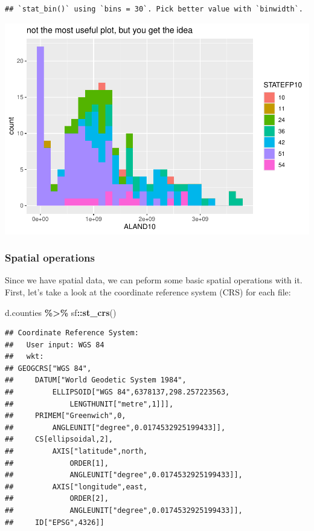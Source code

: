 \documentclass[]{article}
\newenvironment{Shaded}{\begin{snugshade}}{\end{snugshade}}
\newcommand{\FunctionTok}[1]{\textcolor[rgb]{0.13,0.29,0.53}{\textbf{#1}}}
\newcommand{\NormalTok}[1]{#1}
\newcommand{\SpecialCharTok}[1]{\textcolor[rgb]{0.81,0.36,0.00}{\textbf{#1}}}
\begin{document}
\begin{verbatim}
## `stat_bin()` using `bins = 30`. Pick better value with `binwidth`.
\end{verbatim}

\includegraphics{lab01_files/figure-latex/plots2-1.pdf}

\subsubsection{Spatial operations}\label{spatial-operations}

Since we have spatial data, we can peform some basic spatial operations
with it. First, let's take a look at the coordinate reference system
(CRS) for each file:

\begin{Shaded}
\begin{Highlighting}[]
\NormalTok{d.counties }\SpecialCharTok{\%\textgreater{}\%}\NormalTok{ sf}\SpecialCharTok{::}\FunctionTok{st\_crs}\NormalTok{()}
\end{Highlighting}
\end{Shaded}

\begin{verbatim}
## Coordinate Reference System:
##   User input: WGS 84 
##   wkt:
## GEOGCRS["WGS 84",
##     DATUM["World Geodetic System 1984",
##         ELLIPSOID["WGS 84",6378137,298.257223563,
##             LENGTHUNIT["metre",1]]],
##     PRIMEM["Greenwich",0,
##         ANGLEUNIT["degree",0.0174532925199433]],
##     CS[ellipsoidal,2],
##         AXIS["latitude",north,
##             ORDER[1],
##             ANGLEUNIT["degree",0.0174532925199433]],
##         AXIS["longitude",east,
##             ORDER[2],
##             ANGLEUNIT["degree",0.0174532925199433]],
##     ID["EPSG",4326]]
\end{verbatim}
\end{document}
